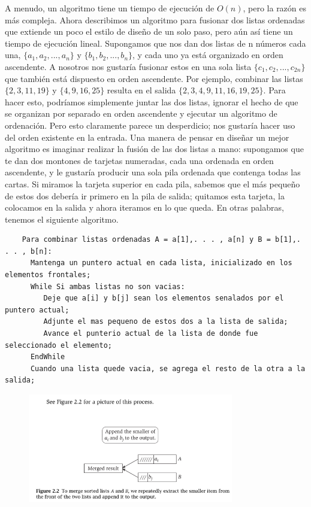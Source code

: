 \documentclass[a4paper]{article}
\begin{document}
A menudo, un algoritmo tiene un tiempo de ejecución de $O(n)$, pero la razón es más compleja. Ahora describimos un algoritmo para fusionar dos listas ordenadas que extiende un poco el estilo de diseño de un solo paso, pero aún así tiene un tiempo de ejecución lineal. Supongamos que nos dan dos listas de n números cada una, $ \{a_1, a_2,. . . , a_n\}$ y $\{b_1, b_2,. . . , b_n\}$, y cada uno ya está organizado en orden ascendente. A nosotros nos gustaría fusionar estos en una sola lista $\{c_1, c_2,. . . , c_{2n}\}$ que también está dispuesto en orden ascendente. Por ejemplo, combinar las listas $\{2, 3, 11, 19\}$ y $\{4, 9, 16, 25\}$ resulta en el salida $\{2, 3, 4, 9, 11, 16, 19, 25\}$. Para hacer esto, podríamos simplemente juntar las dos listas, ignorar el hecho de que se organizan por separado en orden ascendente y ejecutar un algoritmo de ordenación. Pero esto claramente parece un desperdicio; nos gustaría hacer uso del orden existente en la entrada. Una manera de pensar en diseñar un mejor algoritmo es imaginar realizar la fusión de las dos listas a mano: supongamos que te dan dos montones de tarjetas numeradas, cada una ordenada en orden ascendente, y le gustaría producir una sola pila ordenada que contenga todas las cartas. Si miramos la tarjeta superior en cada pila, sabemos que el más pequeño de estos dos debería ir primero en la pila de salida; quitamos esta tarjeta, la colocamos en la salida y ahora iteramos en lo que queda. En otras palabras, tenemos el siguiente algoritmo.\\

\begin{lstlisting}
	Para combinar listas ordenadas A = a[1],. . . , a[n] y B = b[1],. . . , b[n]:
      Mantenga un puntero actual en cada lista, inicializado en los elementos frontales;
      While Si ambas listas no son vacias:
         Deje que a[i] y b[j] sean los elementos senalados por el puntero actual;
         Adjunte el mas pequeno de estos dos a la lista de salida;
         Avance el punterio actual de la lista de donde fue seleccionado el elemento;
      EndWhile
      Cuando una lista quede vacia, se agrega el resto de la otra a la salida;
\end{lstlisting}



\begin{figure}[h] 
  \centering
    \includegraphics[width=0.8\textwidth]{Imagenes-Seccion2/fig2_2_real.PNG}
\end{figure}
\end{document}
